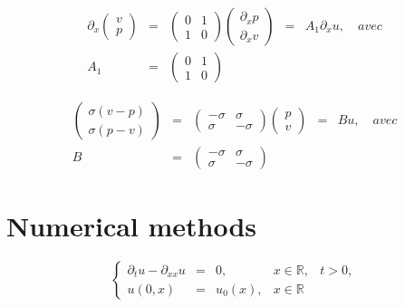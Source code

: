 \documentclass[a4paper,11pt]{article}
\begin{document}
\begin{equation*}
\begin{array}{rclcl}
    \partial_{x}
    \begin{pmatrix}
        v \\
        p
    \end{pmatrix} &=&
    \begin{pmatrix}
        0 & 1 \\
        1 & 0
    \end{pmatrix}
    \begin{pmatrix}
        \partial_{x}p \\
        \partial_{x}v
    \end{pmatrix} &=&
    A_{1}\partial_{x}u, \quad avec \\
    A_{1} &=&
    \begin{pmatrix}
        0 & 1 \\
        1 & 0
    \end{pmatrix} & &
\end{array}
\end{equation*}

\begin{equation*}
\begin{array}{rclcl}
    \begin{pmatrix}
        \sigma(v-p) \\
        \sigma(p-v)
    \end{pmatrix} &=&
    \begin{pmatrix}
        -\sigma & \sigma \\
        \sigma & -\sigma
    \end{pmatrix}
    \begin{pmatrix}
        p \\
        v
    \end{pmatrix} &=&
    Bu, \quad avec \\
    B &=&
    \begin{pmatrix}
        -\sigma & \sigma \\
        \sigma & -\sigma
    \end{pmatrix} & &
\end{array}
\end{equation*}



\section{Numerical methods}

\begin{equation}
    \left\{
    \begin{array}{rclll}
        \partial_{t}u - \partial_{xx}u &=& 0, &x \in \mathbb{R}, & t>0, \\
        u(0, x) &=& u_{0}(x), &x \in \mathbb{R} &
    \end{array}
    \right.
\end{equation}
\end{document}
